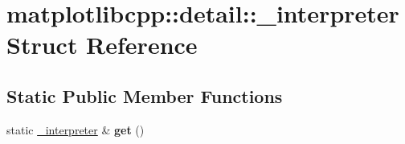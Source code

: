 \hypertarget{structmatplotlibcpp_1_1detail_1_1__interpreter}{}\section{matplotlibcpp\+:\+:detail\+:\+:\+\_\+interpreter Struct Reference}
\label{structmatplotlibcpp_1_1detail_1_1__interpreter}
\subsection*{Static Public Member Functions}
\begin{DoxyCompactItemize}
\item 
\mbox{\label{structmatplotlibcpp_1_1detail_1_1__interpreter_a3ddc4e50c23738307da3dc64c47cdbc0}} 
static \hyperlink{structmatplotlibcpp_1_1detail_1_1__interpreter}{\+\_\+interpreter} \& {\bfseries get} ()
\end{DoxyCompactItemize}

